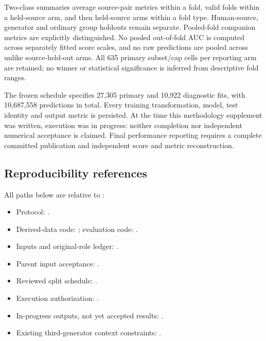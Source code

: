 Two-class summaries average source-pair metrics within a fold, valid folds
within a held-source arm, and then held-source arms within a fold type.
Human-source, generator and ordinary group holdouts remain separate.
Pooled-fold companion metrics are explicitly distinguished. No pooled
out-of-fold AUC is computed across separately fitted score scales, and no
raw predictions are pooled across unlike source-held-out arms. All 635
primary subset/cap cells per reporting arm are retained; no winner or
statistical significance is inferred from descriptive fold ranges.

The frozen schedule specifies 27,305 primary and 10,922 diagnostic fits,
with 10,687,558 predictions in total. Every training transformation, model,
test identity and output metric is persisted. At the time this methodology
supplement was written, execution was in progress: neither completion nor
independent numerical acceptance is claimed. Final performance reporting
requires a complete committed publication and independent score and metric
reconstruction.

\subsection{Reproducibility references}

All paths below are relative to
:
\begin{itemize}
\item Protocol: .
\item Derived-data code: ;
evaluation code: .
\item Inputs and original-role ledger:
.
\item Parent input acceptance:
.
\item Reviewed split schedule:
.
\item Execution authorization:
.
\item In-progress outputs, not yet accepted results:
.
\item Existing third-generator context constraints:
.
\end{itemize}
